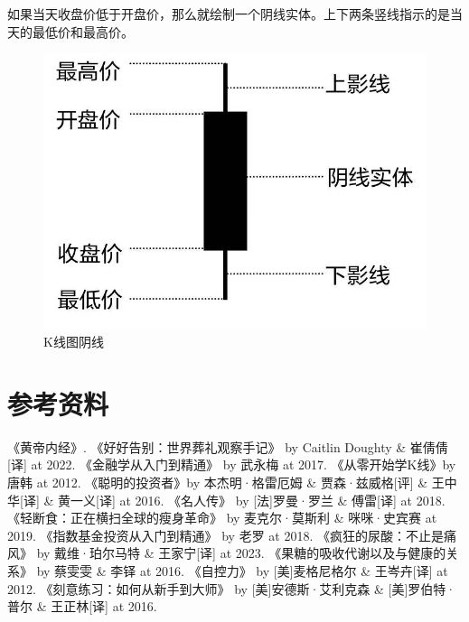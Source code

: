 \documentclass[12pt,oneside]{book}
\begin{document}
如果当天收盘价低于开盘价，那么就绘制一个阴线实体。上下两条竖线指示的是当天的最低价和最高价。

\begin{figure}[H]
\centering
\includegraphics[width=\linewidth ,totalheight=0.95\textheight , keepaspectratio]{K线图阴线.jpg}
\caption{K线图阴线}
\end{figure}



\chapter{参考资料}
\begin{thebibliography}{99}
 《黄帝内经》.
 《好好告别：世界葬礼观察手记》 by Caitlin Doughty \& 崔倩倩[译] at 2022. 
 《金融学从入门到精通》 by 武永梅 at 2017.
 《从零开始学K线》by 唐韩 at 2012. 
 《聪明的投资者》by 本杰明·格雷厄姆 \& 贾森·兹威格[评] \& 王中华[译] \& 黄一义[译] at 2016.
 《名人传》 by [法]罗曼·罗兰 \& 傅雷[译] at 2018.
  《轻断食：正在横扫全球的瘦身革命》 by 麦克尔·莫斯利 \& 咪咪·史宾赛 at 2019.
  《指数基金投资从入门到精通》 by 老罗 at 2018.
  《疯狂的尿酸：不止是痛风》 by 戴维·珀尔马特 \& 王家宁[译] at 2023.
  《果糖的吸收代谢以及与健康的关系》 by 蔡雯雯 \& 李铎 at 2016.
  《自控力》 by [美]麦格尼格尔  \& 王岑卉[译] at 2012.
 《刻意练习：如何从新手到大师》 by [美]安德斯·艾利克森 \& [美]罗伯特·普尔 \& 王正林[译] at 2016.

\end{thebibliography}
\end{document}
